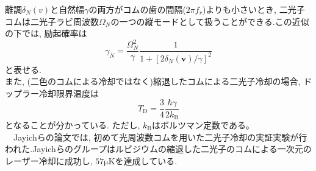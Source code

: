 \documentclass[uplatex, dvipdfmx, a4paper, report, papersize, 11pt]{jsbook}
\begin{document}
離調$\delta _{N}\left( v\right)$と自然幅$\gamma$の両方がコムの歯の間隔($2\pi f_r$)よりも小さいとき, 二光子コムは二光子ラビ周波数$\Omega_N$の一つの縦モードとして扱うことができる.この近似の下では, 励起確率は
\begin{equation}\label{EffectiveExcitationRate}
\gamma_N = \frac{\Omega^2_N}{\gamma}\frac{1}{1 + [2\delta_N(\bm{v})/\gamma]^2}
\end{equation}
と表せる.\\
 また, (二色のコムによる冷却ではなく)縮退したコムによる二光子冷却の場合, ドップラー冷却限界温度は
\begin{equation}
  T_\mathrm{D} = \frac{3}{4}\frac{\hbar\gamma}{2k_\mathrm{B}}
\end{equation}
となることが分かっている. ただし, $k_\mathrm{B}$はボルツマン定数である。\\
　Jayichらの論文\cite{PhysRevX.6.041004}では, 初めて光周波数コムを用いた二光子冷却の実証実験が行われた.Jayichらのグループはルビジウムの縮退した二光子のコムによる一次元のレーザー冷却に成功し, $57 \mathrm{\mu K}$を達成している.
\end{document}
